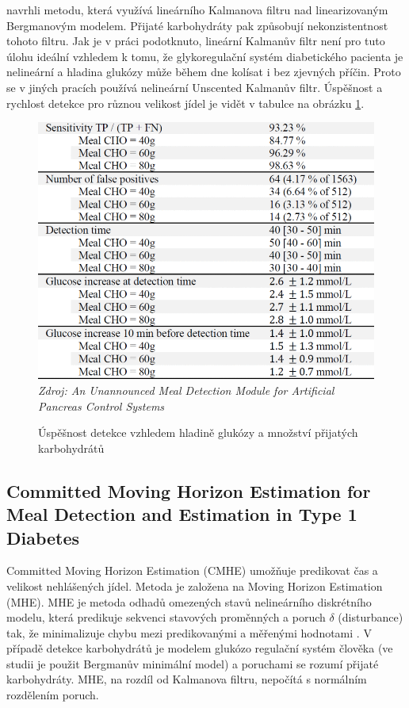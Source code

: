 \citet{analyzaCHO.Nekonzistence} navrhli metodu, která využívá lineárního Kalmanova filtru nad linearizovaným Bergmanovým modelem. Přijaté karbohydráty pak způsobují nekonzistentnost tohoto filtru. Jak je v práci podotknuto, lineární Kalmanův filtr není pro tuto úlohu ideální vzhledem k tomu, že glykoregulační systém diabetického pacienta je nelineární a hladina glukózy může během dne kolísat i bez zjevných příčin. Proto se v jiných pracích používá nelineární Unscented Kalmanův filtr. Úspěšnost a rychlost detekce pro různou velikost jídel je vidět v tabulce na obrázku \ref{fig:analyza:nekonzistence}.

\begin{figure}[H]
\caption{Úspěšnost detekce vzhledem hladině glukózy a množství přijatých karbohydrátů}
\label{fig:analyza:nekonzistence}
\includegraphics[width=1\textwidth]{img/analyzaCHO/nekonzistence.png}\\
\textit{Zdroj: An Unannounced Meal Detection Module for Artificial Pancreas Control Systems \citep{analyzaCHO.Nekonzistence}}
\end{figure}


\subsection{Committed Moving Horizon Estimation for Meal Detection and Estimation in Type 1 Diabetes}
\label{ch:analyzaCHO:horizon}

Committed Moving Horizon Estimation (CMHE) \citep{analyzaCHO.MovingHorizon} umožňuje predikovat čas a velikost nehlášených jídel. Metoda je založena na Moving Horizon Estimation (MHE). MHE je metoda odhadů omezených stavů nelineárního diskrétního modelu, která predikuje sekvenci stavových proměnných a poruch $\delta$ (disturbance) tak, že minimalizuje chybu mezi predikovanými a měřenými hodnotami \citep{analyzaCHO.MovingHorizon}. V případě detekce karbohydrátů je modelem glukózo regulační systém člověka (ve studii je použit Bergmanův minimální model) a poruchami se rozumí přijaté karbohydráty. MHE, na rozdíl od Kalmanova filtru, nepočítá s normálním rozdělením poruch. 

